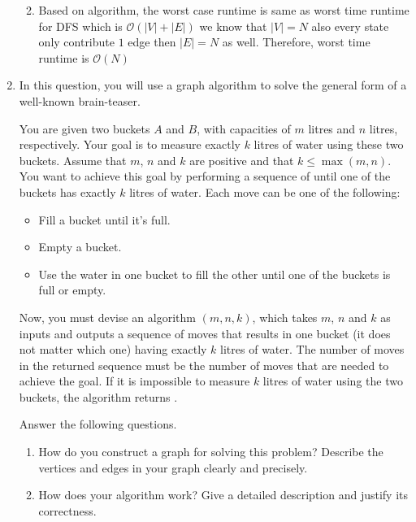 \documentclass[11pt,twoside]{article}
\begin{document}
\begin{enumerate}[leftmargin=0pt]
\begin{enumerate}[topsep=\parsep]
\begin{itemize}[label = {}]
	\end{itemize} 
	
	\item Based on algorithm, the worst case runtime is same as worst time runtime for DFS which is $\mathcal {O}(|V|+|E|)$ we know that $|V| = N$ also every state only contribute $1$ edge then $|E| = N$ as well. Therefore,  worst time runtime  is $\mathcal{O}(N)$
	
	\end{enumerate}		

\item
	In this question, you will use a graph algorithm to solve the general
	form of a well-known brain-teaser.

	You are given two  buckets $A$ and $B$, with
	capacities of $m$ litres and $n$ litres, respectively. Your goal is to
	measure exactly $k$ litres of water using these two buckets.
	Assume that $m$, $n$ and $k$ are positive  and that
	$k \le \max(m, n)$. You want to achieve this goal by performing a
	sequence of  until one of the buckets has exactly $k$
	litres of water. Each move can be one of the following:
	\begin{itemize}[topsep=0pt,itemsep=0pt]
	\item  Fill a bucket until it's full.
	\item  Empty a bucket.
	\item  Use the water in one bucket to fill the other until one of
			the buckets is full or empty.
	\end{itemize}
	Now, you must devise an algorithm $(m, n, k)$, which
	takes $m$, $n$ and $k$ as inputs and outputs a sequence of moves that
	results in one bucket (it does not matter which one) having exactly $k$
	litres of water. The number of moves in the returned sequence must be
	the  number of moves that are needed to
	achieve the goal. If it is impossible to measure $k$ litres of water
	using the two buckets, the algorithm returns \nil.

	Answer the following questions.
	\begin{enumerate}[topsep=\parsep]

	\item  How do you construct a graph for solving this problem?
		Describe the vertices and edges in your graph clearly and precisely.

	\item  How does your algorithm work? Give a detailed description
		and justify its correctness.


\end{enumerate}
\end{enumerate}
\end{document}
